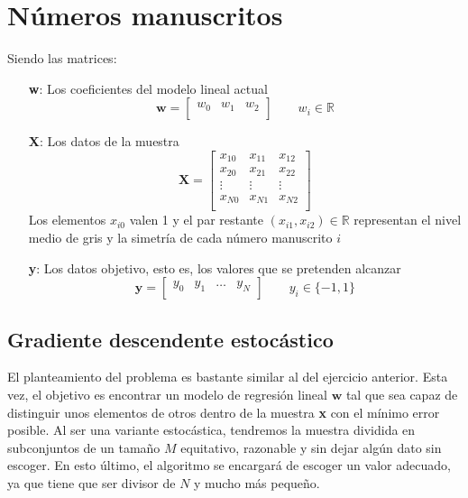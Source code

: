 \documentclass{article}
\begin{document}
    \section{Números manuscritos}
    Siendo las matrices:
    \begin{itemize}
        \item[\textbf{w}:]Los coeficientes del modelo lineal actual
        \begin{equation*}
            \textbf{w} =
            \begin{bmatrix}
                w_0 & w_1 & w_2 \\
            \end{bmatrix}
            \qquad w_i \in \mathbb{R}
        \end{equation*} 
        \item[\textbf{X}:]Los datos de la muestra
        \begin{equation*}
            \textbf{X} =
            \begin{bmatrix}
                x_{10} & x_{11} & x_{12} \\
                x_{20} & x_{21} & x_{22} \\
                \vdots & \vdots & \vdots \\
                x_{N0} & x_{N1} & x_{N2} \\
            \end{bmatrix}
        \end{equation*}
        Los elementos $ x_{i0}$ valen 1
        y el par restante $(x_{i1}, x_{i2}) \in \mathbb{R}$
        representan el nivel medio de gris
        y la simetría de cada número manuscrito $i$
        \item[\textbf{y}:]Los datos objetivo, esto es, los valores que se pretenden alcanzar
        \begin{equation*}
            \textbf{y} = 
            \begin{bmatrix}
                y_0 & y_1 & \dots & y_N \\
            \end{bmatrix}
            \qquad y_i \in \{-1,1\}
        \end{equation*} 
    \end{itemize}
    
    \subsection{Gradiente descendente estocástico}
    El planteamiento del problema es bastante similar al del ejercicio anterior. Esta vez, el objetivo es
    encontrar un modelo de regresión lineal $\textbf{w}$ tal que sea capaz de distinguir unos elementos de otros
    dentro de la muestra \textbf{x} con el mínimo error posible. Al ser una variante estocástica, tendremos la
    muestra dividida en subconjuntos de un tamaño $M$ equitativo, razonable y sin dejar algún dato sin escoger.
    En esto último, el algoritmo se encargará de escoger un valor adecuado, ya que tiene que ser divisor de $N$
    y mucho más pequeño.
\end{document}

